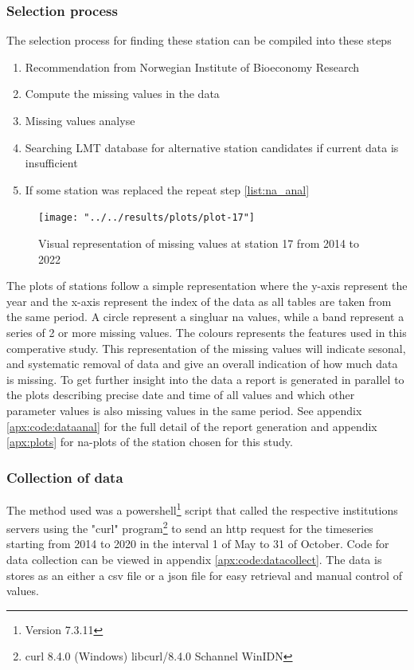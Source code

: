 \subsubsection{Selection process}
The selection process for finding these station can be compiled into these steps

\begin{enumerate}
	\item Recommendation from Norwegian Institute of Bioeconomy Research
	\item \label{list:na_anal}Compute the missing values in the data
	\item Missing values analyse 
	\item Searching LMT database for alternative station candidates if current data is insufficient
	\item If some station was replaced the repeat step \ref{list:na_anal}
\end{enumerate}

\begin{figure}
	\centering
	\label{fig:plot-17}
	\texttt{[image: "../../results/plots/plot-17"]}
	\caption{Visual representation of missing values at station 17 from 2014 to 2022}
\end{figure}

The plots of stations follow a simple representation where the y-axis represent the year and the x-axis represent the index of the data as all tables are taken from the same period. A circle represent a singluar na values, while a band represent a series of 2 or more missing values. The colours represents the features used in this comperative study. This representation of the missing values will indicate sesonal, and systematic removal of data and give an overall indication of how much data is missing. To get further insight into the data a report is generated in parallel to the plots describing precise date and time of all values and which other parameter values is also missing values in the same period. See appendix \ref{apx:code:dataanal} for the full detail of the report generation and appendix \ref{apx:plots} for na-plots of the station chosen for this study.

\subsubsection{Collection of data}

The method used was a powershell\footnote{Version 7.3.11} script that called the respective institutions servers using the "curl" program\footnote{curl 8.4.0 (Windows) libcurl/8.4.0 Schannel WinIDN} to send an http request for the timeseries starting from 2014 to 2020 in the interval 1 of May to 31 of October. Code for data collection can be viewed in appendix \ref{apx:code:datacollect}. The data is stores as an either a csv file or a json file for easy retrieval and manual control of values.

